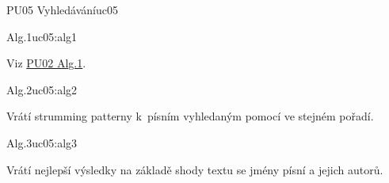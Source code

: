 \begin{usecase}{PU05 Vyhledávání}{uc05}
    \begin{scenario}{Alg.1}{uc05:alg1}
        \item Viz \hyperref[uc02:alg1]{PU02 Alg.1}.
    \end{scenario}

    \begin{scenario}{Alg.2}{uc05:alg2}
        \item Vrátí strumming patterny k~písním vyhledaným pomocí  ve stejném pořadí.
    \end{scenario}

    \begin{scenario}{Alg.3}{uc05:alg3}
        \item Vrátí nejlepší výsledky na základě shody textu se jmény písní a jejich autorů.
    \end{scenario}
\end{usecase}
